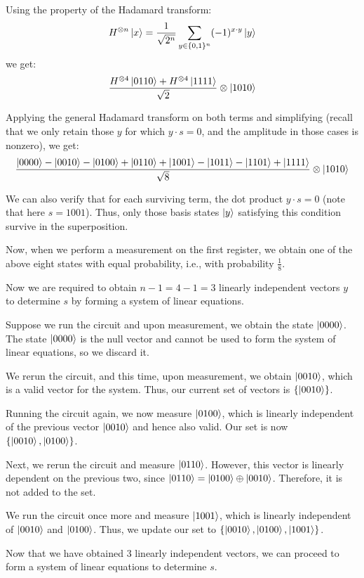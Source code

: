 \begin{example}
Using the property of the Hadamard transform:
\[
    H^{\otimes n} \ket{x} = \frac{1}{\sqrt{2^n}} \sum_{y \in \{0,1\}^n} (-1)^{x \cdot y} \ket{y}
\]
we get:
\[
    \frac{H^{\otimes 4} \ket{0110} + H^{\otimes 4} \ket{1111}}{\sqrt{2}} \otimes \ket{1010}
\]

Applying the general Hadamard transform on both terms and simplifying (recall that we only retain those $y$ for which $y \cdot s = 0$, and the amplitude in those cases is nonzero), we get:
\[
    \frac{\ket{0000} - \ket{0010} - \ket{0100} + \ket{0110} + \ket{1001} - \ket{1011} - \ket{1101} + \ket{1111}}{\sqrt{8}} \otimes \ket{1010}
\]

We can also verify that for each surviving term, the dot product $y \cdot s = 0$ (note that here $s = 1001$). Thus, only those basis states $\ket{y}$ satisfying this condition survive in the superposition.

Now, when we perform a measurement on the first register, we obtain one of the above eight states with equal probability, i.e., with probability $\frac{1}{8}$.
 

    Now we are required to obtain $n - 1 = 4 - 1 = 3$ linearly independent vectors $y$ to determine $s$ by forming a system of linear equations.

Suppose we run the circuit and upon measurement, we obtain the state $\ket{0000}$. The state $\ket{0000}$ is the null vector and cannot be used to form the system of linear equations, so we discard it.

We rerun the circuit, and this time, upon measurement, we obtain $\ket{0010}$, which is a valid vector for the system. Thus, our current set of vectors is $\{\ket{0010}\}$.

Running the circuit again, we now measure $\ket{0100}$, which is linearly independent of the previous vector $\ket{0010}$ and hence also valid. Our set is now $\{\ket{0010}, \ket{0100}\}$.

Next, we rerun the circuit and measure $\ket{0110}$. However, this vector is linearly dependent on the previous two, since $\ket{0110} = \ket{0100} \oplus \ket{0010}$. Therefore, it is not added to the set.

We run the circuit once more and measure $\ket{1001}$, which is linearly independent of $\ket{0010}$ and $\ket{0100}$. Thus, we update our set to $\{\ket{0010}, \ket{0100}, \ket{1001}\}$.

Now that we have obtained 3 linearly independent vectors, we can proceed to form a system of linear equations to determine $s$.



\end{example}
